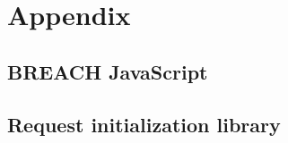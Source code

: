 \chapter{Appendix}\label{ch:appendix}

\section{BREACH JavaScript}\label{sec:evil_js}


\section{Request initialization library}\label{sec:hillclimbing_py}


